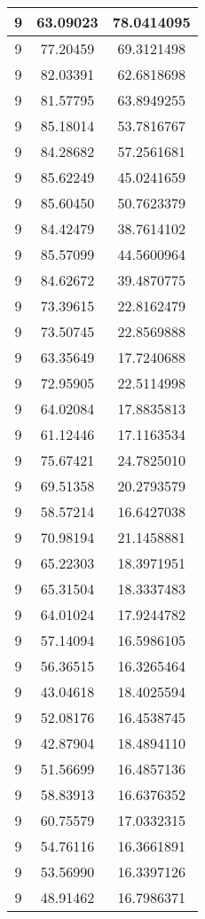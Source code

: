 \documentclass[
]{book}
\begin{document}
\begin{tabular}{c|c|c}
\hline
9 & 63.09023 & 78.0414095\\
\hline
9 & 77.20459 & 69.3121498\\
\hline
9 & 82.03391 & 62.6818698\\
\hline
9 & 81.57795 & 63.8949255\\
\hline
9 & 85.18014 & 53.7816767\\
\hline
9 & 84.28682 & 57.2561681\\
\hline
9 & 85.62249 & 45.0241659\\
\hline
9 & 85.60450 & 50.7623379\\
\hline
9 & 84.42479 & 38.7614102\\
\hline
9 & 85.57099 & 44.5600964\\
\hline
9 & 84.62672 & 39.4870775\\
\hline
9 & 73.39615 & 22.8162479\\
\hline
9 & 73.50745 & 22.8569888\\
\hline
9 & 63.35649 & 17.7240688\\
\hline
9 & 72.95905 & 22.5114998\\
\hline
9 & 64.02084 & 17.8835813\\
\hline
9 & 61.12446 & 17.1163534\\
\hline
9 & 75.67421 & 24.7825010\\
\hline
9 & 69.51358 & 20.2793579\\
\hline
9 & 58.57214 & 16.6427038\\
\hline
9 & 70.98194 & 21.1458881\\
\hline
9 & 65.22303 & 18.3971951\\
\hline
9 & 65.31504 & 18.3337483\\
\hline
9 & 64.01024 & 17.9244782\\
\hline
9 & 57.14094 & 16.5986105\\
\hline
9 & 56.36515 & 16.3265464\\
\hline
9 & 43.04618 & 18.4025594\\
\hline
9 & 52.08176 & 16.4538745\\
\hline
9 & 42.87904 & 18.4894110\\
\hline
9 & 51.56699 & 16.4857136\\
\hline
9 & 58.83913 & 16.6376352\\
\hline
9 & 60.75579 & 17.0332315\\
\hline
9 & 54.76116 & 16.3661891\\
\hline
9 & 53.56990 & 16.3397126\\
\hline
9 & 48.91462 & 16.7986371\\

\end{tabular}
\end{document}
